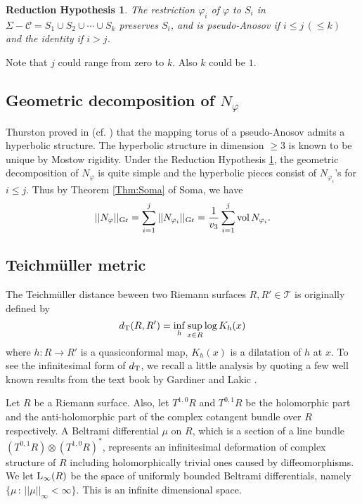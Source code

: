 \documentclass[11pt,reqno]{amsart}
\newtheorem{reduction}[theorem]{Reduction Hypothesis}
\numberwithin{equation}{section}
\begin{document}
\begin{reduction}\label{Reduction} 
The restriction  $\varphi_i$  of  $\varphi$  to  $S_i$  in  
$\varSigma  - \mathcal{C} = S_1 \cup S_2 \cup \cdots \cup S_k$  
preserves  $S_i$,    
and is pseudo-Anosov if  $i \leq j \, (\leq k)$  and 
the identity if  $ i > j$.  
\end{reduction} 

\noindent 
Note that  $j$  could range from zero to  $k$.  
Also  $k$  could be  $1$.  

\subsection{Geometric decomposition of  $N_{\varphi}$}  
 
Thurston proved in \cite{Thurston3} (cf. \cite{OK})  that 
the mapping torus of a pseudo-Anosov admits 
a hyperbolic structure.  
The hyperbolic  structure in dimension $\geq 3$  is known to be 
unique by Mostow rigidity.   
Under the Reduction Hypothesis \ref{Reduction}, 
the geometric decomposition of  $N_{\varphi}$  is quite simple and 
the hyperbolic pieces consist of  $N_{\varphi_i}$'s for  $i \leq j$.  
Thus by Theorem \ref{Thm:Soma} of  Soma,  
we have 
\begin{equation}\label{Eq:Gromov=Vol}
	|| N_{\varphi} ||_{{\rm Gr}} 
	= \sum_{i=1}^j || N_{\varphi_i} ||_{{\rm Gr}}
	= \frac{1}{v_3} \sum_{i=1}^j {\rm vol} \, N_{\varphi_i}.
\end{equation}

\subsection{Teichm\"uller metric} 

The Teichm\"uller distance beween two Riemann surfaces  
$R, R' \in \mathcal{T}$  is originally 
defined by 
\begin{equation*}
	d_{\rm T}(R, R') = \inf_h \sup_{x \in R} \log K_h(x)
\end{equation*} 
where  $h : R \to R'$  is a quasiconformal map, 
$K_h(x)$  is a dilatation of  $h$  at  $x$.  
To see the infinitesimal form of  $d_{{\rm T}}$,  
we recall a little analysis by quoting a few well known results 
from the text book by Gardiner and Lakic  \cite{GL}.   

Let  $R$  be a Riemann surface.   
Also,  
let  $T^{1,0} R$  and  $T^{0,1}R$  be 
the holomorphic part and the anti-holomorphic 
part of the complex cotangent bundle over  $R$  respectively.  
A Beltrami differential  $\mu$  on  $R$, 
which is a section of a line bundle  
$(T^{0,1}R) \otimes (T^{1,0}R)^*$,   
represents an infinitesimal deformation of complex structure of  $R$  
including holomorphically trivial ones 
caused by diffeomorphisms.  
We let  ${\rm L}_{\infty}(R)$  be the space of 
uniformly bounded Beltrami differentials,  
namely  $\{ \mu \, : \, || \mu ||_{\infty} < \infty \}$.  
This is an infinite dimensional space.  
\end{document}
